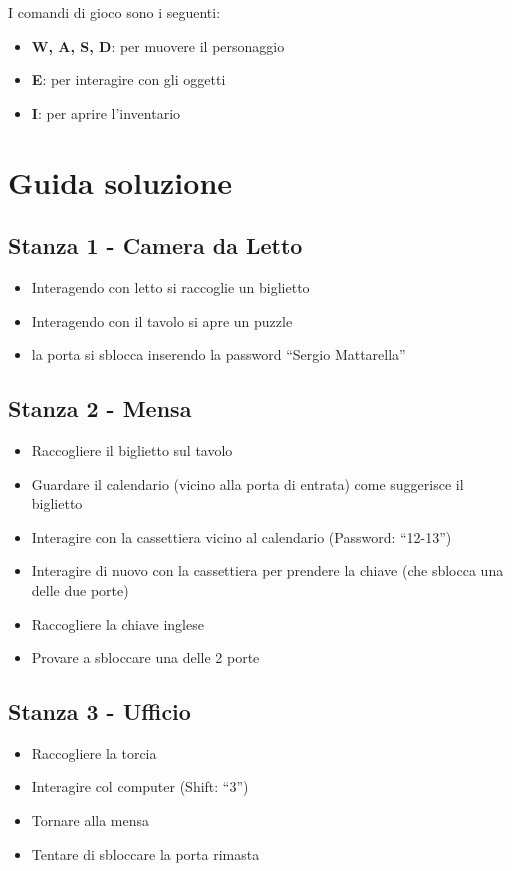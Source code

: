 \documentclass[a4paper,12pt]{report}
\begin{document}
I comandi di gioco sono i seguenti:
\begin{itemize}
	\item \textbf{W, A, S, D}: per muovere il personaggio
	\item \textbf{E}: per interagire con gli oggetti
	\item \textbf{I}: per aprire l'inventario
\end{itemize}

\chapter{Guida soluzione}
%
\section{Stanza 1 - Camera da Letto}
\begin{itemize}
	\item Interagendo con letto si raccoglie un biglietto 
	\item Interagendo con il tavolo si apre un puzzle 
	\item la porta si sblocca inserendo la password “Sergio Mattarella”
\end{itemize}
%
\section{Stanza 2 - Mensa}
\begin{itemize}
	\item Raccogliere il biglietto sul tavolo 
	\item Guardare il calendario (vicino alla porta di entrata) come suggerisce il biglietto 
	\item Interagire con la cassettiera vicino al calendario (Password: “12-13”) 
	\item Interagire di nuovo con la cassettiera per prendere la chiave (che sblocca una delle due porte) 
	\item Raccogliere la chiave inglese  
	\item Provare a sbloccare una delle 2 porte
\end{itemize}
%
\section{Stanza 3 - Ufficio}
\begin{itemize}
	\item Raccogliere la torcia 
	\item Interagire col computer (Shift: “3”) 
	\item Tornare alla mensa 
	\item Tentare di sbloccare la porta rimasta 
\end{itemize}
%
\end{document}
